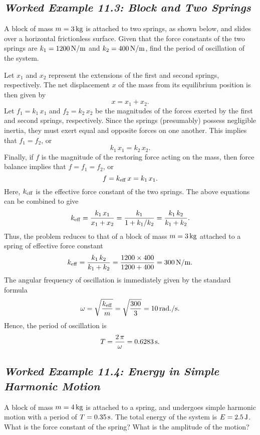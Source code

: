 \subsection*{\em Worked Example 11.3: Block and Two Springs}
 A block of mass $m=3\,{\rm kg}$ is attached to
two springs, as shown below, and slides over a horizontal frictionless
surface. Given that the force constants of the two springs
are $k_1= 1200\,{\rm N/m}$ and $k_2= 400\,{\rm N/m}$, find the period
of oscillation of the system.

\begin{figure*}[h]
\epsfysize=1.5in
\centerline{}
\end{figure*}

Let $x_1$ and $x_2$ represent the extensions of the first and second springs, respectively. 
The net displacement $x$ of the mass from its equilibrium position is then given by
$$
x = x_1 + x_2.
$$
Let $f_1 = k_1\,x_1$ and $f_2=k_2\,x_2$ be the  magnitudes of the forces exerted by the first and second springs,
respectively. Since the springs  (presumably)  possess negligible inertia,
they must exert equal and opposite forces on one another. This implies that $f_1 = f_2$, or
$$
k_1\, x_1 = k_2\,x_2.
$$
Finally, if $f$ is the magnitude of the restoring force acting on the mass, then 
force balance implies that $f = f_1 = f_2$, or
$$
f = k_{\rm eff}\, x = k_1\,x_1.
$$
Here, $k_{\rm eff}$ is the effective force constant of the two springs. 
The above equations can be combined to give
$$
k_{\rm eff} = \frac{k_1\,x_1}{x_1+x_2} = \frac{k_1}{1+ k_1/k_2} = \frac{k_1\,k_2}{k_1+k_2}.
$$
Thus, the problem reduces to that of a block of mass $m=3\,{\rm kg}$ attached to
a spring of effective force constant
$$
k_{\rm eff} = \frac{k_1\,k_2}{k_1+k_2} = \frac{1200\times 400}{1200+400} = 300\,{\rm N/m}.
$$
The angular frequency of oscillation is immediately given by the standard formula
$$
\omega = \sqrt{\frac{k_{\rm eff}}{m}}=\sqrt{\frac{300}{3}} = 10\,{\rm rad./s}.
$$
Hence, the period of oscillation is
$$
T = \frac{2\,\pi}{\omega} = 0.6283\,{\rm s}.
$$

\subsection*{\em Worked Example 11.4: Energy in Simple Harmonic Motion}
A block of mass $m=4\,{\rm kg}$ is attached to a spring, and undergoes simple harmonic
motion with a period of $T=0.35\,{\rm s}$. The total energy of the system is
$E=2.5\,{\rm J}$. What is the force constant of the spring? What is the amplitude
of the motion?

